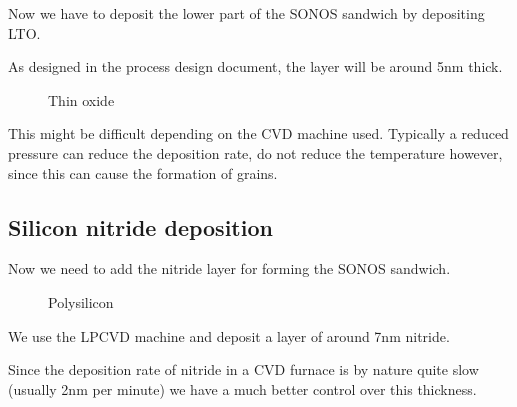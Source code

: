 Now we have to deposit the lower part of the SONOS sandwich by depositing LTO.

As designed in the process design document, the layer will be around 5nm thick.

\begin{figure}[H]
	\centering
	\begin{tikzpicture}[node distance = 3cm, auto, thick,scale=\CrossSectionOnly, every node/.style={transform shape}]
		
	\end{tikzpicture}
	\begin{tikzpicture}[node distance = 3cm, auto, thick,scale=\CrossSectionOnly, every node/.style={transform shape}]
		
	\end{tikzpicture}
	\caption{Thin oxide}
\end{figure}

This might be difficult depending on the CVD machine used. Typically a reduced pressure can reduce the deposition rate, do not reduce the temperature however, since this can cause the formation of grains.

\subsection{Silicon nitride deposition}\label{step_depositing_sonos_nitride}

Now we need to add the nitride layer for forming the SONOS sandwich.

\begin{figure}[H]
	\centering
	\begin{tikzpicture}[node distance = 3cm, auto, thick,scale=\CrossSectionOnly, every node/.style={transform shape}]
		
	\end{tikzpicture}
	\begin{tikzpicture}[node distance = 3cm, auto, thick,scale=\CrossSectionOnly, every node/.style={transform shape}]
		
	\end{tikzpicture}
	\caption{Polysilicon}
\end{figure}

We use the LPCVD machine and deposit a layer of around 7nm nitride.

Since the deposition rate of nitride in a CVD furnace is by nature quite slow (usually 2nm per minute) we have a much better control over this thickness.

